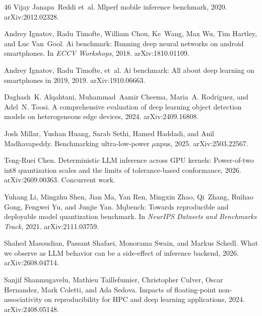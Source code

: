 \documentclass[11pt]{article}
\begin{document}
\begin{thebibliography}{46}
Vijay Janapa~Reddi et~al.
\newblock Mlperf mobile inference benchmark, 2020.
\newblock arXiv:2012.02328.

Andrey Ignatov, Radu Timofte, William Chou, Ke~Wang, Max Wu, Tim Hartley, and Luc Van~Gool.
\newblock Ai benchmark: Running deep neural networks on android smartphones.
\newblock In \emph{ECCV Workshops}, 2018.
\newblock arXiv:1810.01109.

Andrey Ignatov, Radu Timofte, et~al.
\newblock Ai benchmark: All about deep learning on smartphones in 2019, 2019.
\newblock arXiv:1910.06663.

Daghash~K. Alqahtani, Muhammad~Aamir Cheema, Maria~A. Rodriguez, and Adel~N. Toosi.
\newblock A comprehensive evaluation of deep learning object detection models on heterogeneous edge devices, 2024.
\newblock arXiv:2409.16808.

Josh Millar, Yushan Huang, Sarab Sethi, Hamed Haddadi, and Anil Madhavapeddy.
\newblock Benchmarking ultra-low-power {$\mu$}npus, 2025.
\newblock arXiv:2503.22567.

Teng-Ruei Chen.
\newblock Deterministic {LLM} inference across {GPU} kernels: Power-of-two int8 quantization scales and the limits of tolerance-based conformance, 2026{}.
\newblock arXiv:2609.00363. Concurrent work.

Yuhang Li, Mingzhu Shen, Jian Ma, Yan Ren, Mingxin Zhao, Qi~Zhang, Ruihao Gong, Fengwei Yu, and Junjie Yan.
\newblock Mqbench: Towards reproducible and deployable model quantization benchmark.
\newblock In \emph{NeurIPS Datasets and Benchmarks Track}, 2021.
\newblock arXiv:2111.03759.

Shahed Masoudian, Passant Shafaei, Monorama Swain, and Markus Schedl.
\newblock What we observe as {LLM} behavior can be a side-effect of inference backend, 2026.
\newblock arXiv:2608.04714.

Sanjif Shanmugavelu, Mathieu Taillefumier, Christopher Culver, Oscar Hernandez, Mark Coletti, and Ada Sedova.
\newblock Impacts of floating-point non-associativity on reproducibility for {HPC} and deep learning applications, 2024.
\newblock arXiv:2408.05148.


\end{thebibliography}
\end{document}
